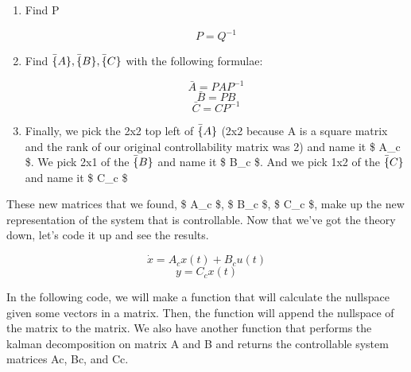 \documentclass[11pt]{article}
\begin{document}
    \begin{enumerate}
\def\labelenumi{\arabic{enumi}.}
\setcounter{enumi}{1}
\item
  Find P

  \[ P = Q^{-1} \]
\item
  Find $ \bar\{A\}  ,  \bar\{B\} ,  \bar\{C\} $ with the
  following formulae:

  \[ \bar{A} = PAP^{-1} \] \[ \bar{B} = PB \] \[ \bar{C} = CP^{-1} \]
\item
  Finally, we pick the 2x2 top left of $ \bar\{A\} $ (2x2 because A is
  a square matrix and the rank of our original controllability matrix
  was 2) and name it \$ A\_c \$. We pick 2x1 of the $ \bar\{B\} $ and
  name it \$ B\_c \$. And we pick 1x2 of the $ \bar\{C\} $ and name it
  \$ C\_c \$
\end{enumerate}

These new matrices that we found, \$ A\_c \$, \$ B\_c \$, \$ C\_c \$,
make up the new representation of the system that is controllable. Now
that we've got the theory down, let's code it up and see the results.

\[ \dot{x} = A_c x(t) + B_c u(t) \] \[ y = C_c x(t) \]

In the following code, we will make a function that will calculate the
nullspace given some vectors in a matrix. Then, the function will append
the nullspace of the matrix to the matrix. We also have another function
that performs the kalman decomposition on matrix A and B and returns the
controllable system matrices Ac, Bc, and Cc.
\end{document}
